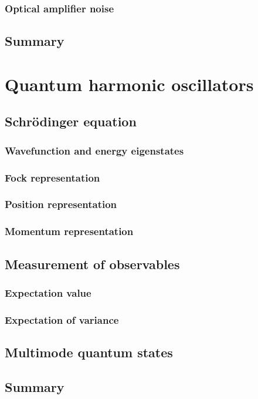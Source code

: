 \documentclass{book}
\begin{document}
\subsection{Optical amplifier noise}
\section{Summary}

\chapter{Quantum harmonic oscillators}
\section{Schr\"odinger equation}
\subsection{Wavefunction and energy eigenstates}
\subsection{Fock representation}
\subsection{Position representation}
\subsection{Momentum representation}
\section{Measurement of observables}
\subsection{Expectation value}
\subsection{Expectation of variance}
\section{Multimode quantum states}
\section{Summary}
\end{document}
